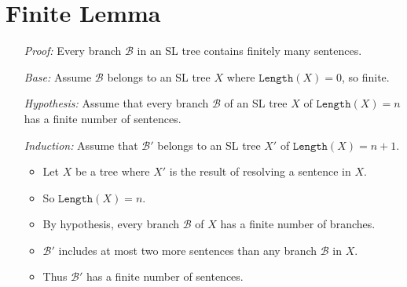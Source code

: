 \documentclass[a4paper, 11pt]{article} %
\newcommand{\B}{\mathcal{B}}
\newcommand{\leng}{\texttt{Length}}
\begin{document}
%
%

\section*{Finite Lemma}

\begin{enumerate}
  \item[\it Proof:] Every branch $\B$ in an SL tree contains finitely many sentences.
  \item[\it Base:] Assume $\B$ belongs to an SL tree $X$ where $\leng(X)=0$, so finite. 
  \item[\it Hypothesis:] Assume that every branch $\B$ of an SL tree $X$ of $\leng(X)=n$ has a finite number of sentences. 
  \item[\it Induction:] Assume that $\B'$ belongs to an SL tree $X'$ of $\leng(X)=n+1$. 
    \begin{itemize}
      \item Let $X$ be a tree where $X'$ is the result of resolving a sentence in $X$. 
      \item So $\leng(X)=n$.
      \item By hypothesis, every branch $\B$ of $X$ has a finite number of branches.
      \item $\B'$ includes at most two more sentences than any branch $\B$ in $X$.
      \item Thus $\B'$ has a finite number of sentences. 
    \end{itemize}
\end{enumerate}
\end{document}
